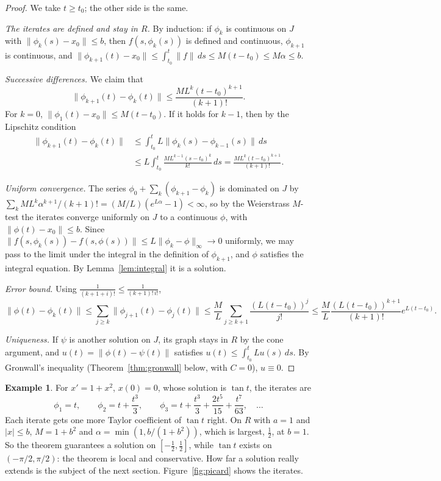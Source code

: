 \documentclass[11pt,a4paper]{article}
\numberwithin{equation}{section}
\theoremstyle{definition}
\newtheorem{exa}[thm]{Example}
\begin{document}
\begin{proof}
We take $t \geq t_0$; the other side is the same.

\emph{The iterates are defined and stay in $R$.} By induction: if $\phi_k$ is continuous on $J$ with $\|\phi_k(s) - x_0\| \leq b$, then $f(s, \phi_k(s))$ is defined and continuous, $\phi_{k+1}$ is
continuous, and $\|\phi_{k+1}(t) - x_0\| \leq \int_{t_0}^t\|f\|\,ds \leq M(t - t_0) \leq M\alpha \leq b$.

\emph{Successive differences.} We claim that
\[
\|\phi_{k+1}(t) - \phi_k(t)\| \leq \frac{ML^k(t - t_0)^{k+1}}{(k + 1)!} .
\]
For $k = 0$, $\|\phi_1(t) - x_0\| \leq M(t - t_0)$. If it holds for $k - 1$, then by the Lipschitz condition
\begin{align*}
\|\phi_{k+1}(t) - \phi_k(t)\| &\leq \int_{t_0}^tL\|\phi_k(s) - \phi_{k-1}(s)\|\,ds\\
&\leq L\int_{t_0}^t\frac{ML^{k-1}(s - t_0)^k}{k!}\,ds = \frac{ML^k(t - t_0)^{k+1}}{(k + 1)!} .
\end{align*}

\emph{Uniform convergence.} The series $\phi_0 + \sum_k(\phi_{k+1} - \phi_k)$ is dominated on $J$ by $\sum_kM L^k\alpha^{k+1}/(k + 1)! = (M/L)(e^{L\alpha} - 1) < \infty$, so by the Weierstrass $M$-test the
iterates converge uniformly on $J$ to a continuous $\phi$, with $\|\phi(t) - x_0\| \leq b$. Since $\|f(s, \phi_k(s)) - f(s, \phi(s))\| \leq L\|\phi_k - \phi\|_\infty \to 0$ uniformly, we may pass to the limit
under the integral in the definition of $\phi_{k+1}$, and $\phi$ satisfies the integral equation. By Lemma~\ref{lem:integral} it is a solution.

\emph{Error bound.} Using $\frac{1}{(k + 1 + i)!} \leq \frac{1}{(k + 1)!\,i!}$,
\[
\|\phi(t) - \phi_k(t)\| \leq \sum_{j \geq k}\|\phi_{j+1}(t) - \phi_j(t)\| \leq \frac ML\sum_{j \geq k+1}\frac{(L(t - t_0))^j}{j!} \leq \frac ML\frac{(L(t - t_0))^{k+1}}{(k + 1)!}e^{L(t - t_0)} .
\]

\emph{Uniqueness.} If $\psi$ is another solution on $J$, its graph stays in $R$ by the cone argument, and $u(t) = \|\phi(t) - \psi(t)\|$ satisfies $u(t) \leq \int_{t_0}^tLu(s)\,ds$. By Gronwall's
inequality (Theorem~\ref{thm:gronwall} below, with $C = 0$), $u \equiv 0$.
\end{proof}

\begin{exa}
\label{ex:tanpicard}
For $x' = 1 + x^2$, $x(0) = 0$, whose solution is $\tan t$, the iterates are
\[
\phi_1 = t, \qquad \phi_2 = t + \frac{t^3}{3}, \qquad \phi_3 = t + \frac{t^3}{3} + \frac{2t^5}{15} + \frac{t^7}{63}, \quad \dots
\]
Each iterate gets one more Taylor coefficient of $\tan t$ right. On $R$ with $a = 1$ and $|x| \leq b$, $M = 1 + b^2$ and $\alpha = \min(1, b/(1 + b^2))$, which is largest, $\frac12$, at $b = 1$. So the
theorem guarantees a solution on $[-\frac12, \frac12]$, while $\tan t$ exists on $(-\pi/2, \pi/2)$: the theorem is local and conservative. How far a solution really extends is the
subject of the next section. Figure~\ref{fig:picard} shows the iterates.
\end{exa}
\end{document}
